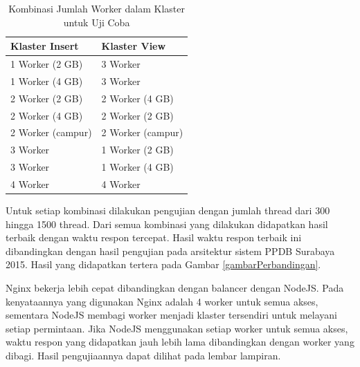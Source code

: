 \documentclass{ta-its}
\begin{document}
					\begin{longtable}{|p{0.3\textwidth}|p{}|} %
						
						\caption{Kombinasi Jumlah Worker dalam Klaster untuk Uji Coba} \label{tabelKombinasi} \\
						\hline
						\textbf{Klaster Insert} & \textbf{Klaster View} \\ \hline
						
						\endhead
						\endfoot
						\endlastfoot
						
						1 Worker (2 GB) & 3 Worker \\ \hline
						1 Worker (4 GB) & 3 Worker \\ \hline
						2 Worker (2 GB) & 2 Worker (4 GB) \\ \hline
						2 Worker (4 GB) & 2 Worker (2 GB) \\ \hline
						2 Worker (campur) & 2 Worker (campur) \\ \hline
						3 Worker & 1 Worker (2 GB) \\ \hline
						3 Worker & 1 Worker (4 GB) \\ \hline
						4 Worker & 4 Worker \\ \hline
						
						
					\end{longtable}
					
					Untuk setiap kombinasi dilakukan pengujian dengan jumlah thread dari 300 hingga 1500 thread. Dari semua kombinasi yang dilakukan didapatkan hasil terbaik dengan waktu respon tercepat. Hasil waktu respon terbaik ini dibandingkan dengan hasil pengujian pada arsitektur sistem PPDB Surabaya 2015. Hasil yang didapatkan tertera pada Gambar \ref{gambarPerbandingan}.
					
					Nginx bekerja lebih cepat dibandingkan dengan balancer dengan NodeJS. Pada kenyataannya yang digunakan Nginx adalah 4 worker untuk semua akses, sementara NodeJS membagi worker menjadi klaster tersendiri untuk melayani setiap permintaan. Jika NodeJS menggunakan setiap worker untuk semua akses, waktu respon yang didapatkan jauh lebih lama dibandingkan dengan worker yang dibagi. Hasil pengujiaannya dapat dilihat pada lembar lampiran.
					
\end{document}
